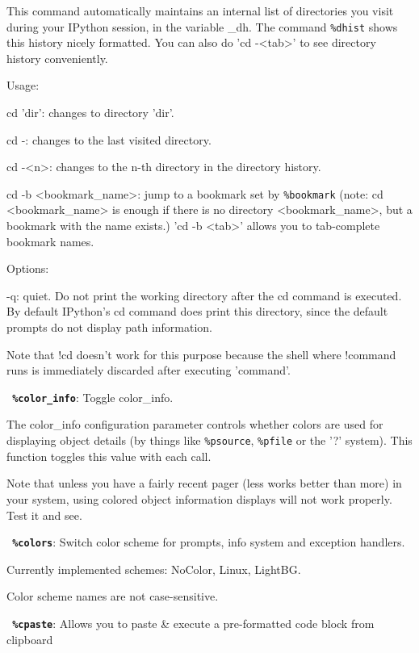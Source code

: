         This command automatically maintains an internal list of directories
        you visit during your IPython session, in the variable \_dh. The
        command \texttt{\%dhist} shows this history nicely formatted. You can also
        do 'cd -<tab>' to see directory history conveniently.

        Usage:

          cd 'dir': changes to directory 'dir'.

          cd -: changes to the last visited directory.

          cd -<n>: changes to the n-th directory in the directory history.

          cd -b <bookmark\_name>: jump to a bookmark set by \texttt{\%bookmark}
             (note: cd <bookmark\_name> is enough if there is no
              directory <bookmark\_name>, but a bookmark with the name exists.)
              'cd -b <tab>' allows you to tab-complete bookmark names. 

        Options:

        -q: quiet.  Do not print the working directory after the cd command is
        executed.  By default IPython's cd command does print this directory,
        since the default prompts do not display path information.
        
        Note that !cd doesn't work for this purpose because the shell where
        !command runs is immediately discarded after executing 'command'.

\bigskip
\texttt{\textbf{ \%color\_info}}:
	Toggle color\_info.

        The color\_info configuration parameter controls whether colors are
        used for displaying object details (by things like \texttt{\%psource}, \texttt{\%pfile} or
        the '?' system). This function toggles this value with each call.

        Note that unless you have a fairly recent pager (less works better
        than more) in your system, using colored object information displays
        will not work properly. Test it and see.

\bigskip
\texttt{\textbf{ \%colors}}:
	Switch color scheme for prompts, info system and exception handlers.

        Currently implemented schemes: NoColor, Linux, LightBG.

        Color scheme names are not case-sensitive.

\bigskip
\texttt{\textbf{ \%cpaste}}:
	Allows you to paste \& execute a pre-formatted code block from clipboard
        

